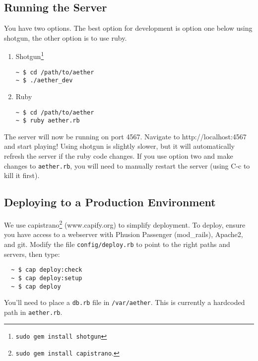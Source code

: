 \documentclass[12pt, letterpaper]{article}
\begin{document}
\subsection{Running the Server}
You have two options. The best option for development is option one below using shotgun, the other option is to use ruby.
\begin{enumerate}
  \item Shotgun\footnote{{\tt sudo gem install shotgun}}
  \begin{verbatim}
~ $ cd /path/to/aether
~ $ ./aether_dev
  \end{verbatim} 
  \item Ruby
  \begin{verbatim}
~ $ cd /path/to/aether
~ $ ruby aether.rb
  \end{verbatim}
\end{enumerate}
The server will now be running on port 4567. Navigate to http://localhost:4567 and start playing! Using shotgun is slightly slower, but it will automatically refresh the server if the ruby code changes. If you use option two and make changes to \verb!aether.rb!, you will need to manually restart the server (using C-c to kill it first).

\subsection{Deploying to a Production Environment}
We use capistrano\footnote{{\tt sudo gem install capistrano}.} (www.capify.org) to simplify deployment. To deploy, ensure you have access to a webserver with Phusion Passenger (mod\_rails), Apache2, and git. Modify the file \verb!config/deploy.rb! to point to the right paths and servers, then type:
\begin{verbatim}
  ~ $ cap deploy:check
  ~ $ cap deploy:setup
  ~ $ cap deploy
\end{verbatim}
You'll need to place a \verb!db.rb! file in \verb!/var/aether!. This is currently a hardcoded path in \verb!aether.rb!.
\end{document}
